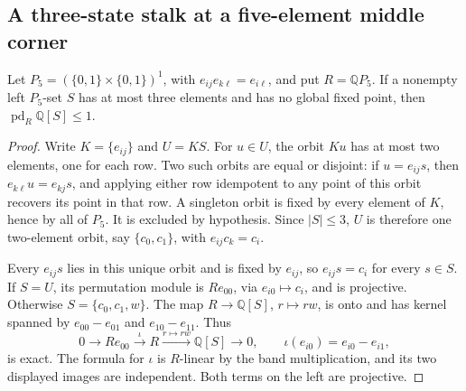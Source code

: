 \subsection{A three-state stalk at a five-element middle corner}

\begin{lemma}
\label{CP2:A-three-state-P5-left-module}
Let $P_5=(\{0,1\}\times\{0,1\})^1$, with
$e_{ij}e_{k\ell}=e_{i\ell}$, and put $R=\mathbb QP_5$.
If a nonempty left $P_5$-set $S$ has at most three elements and
has no global fixed point, then $\operatorname{pd}_R\mathbb Q[S]\leq1$.
\end{lemma}
\begin{proof}
Write $K=\{e_{ij}\}$ and $U=KS$. For $u\in U$, the orbit
$Ku$ has at most two elements, one for each row. Two such orbits
are equal or disjoint: if $u=e_{ij}s$, then
$e_{k\ell}u=e_{kj}s$, and applying either row idempotent to any
point of this orbit recovers its point in that row. A singleton
orbit is fixed by every element of $K$, hence by all of $P_5$.
It is excluded by hypothesis. Since $|S|\leq3$, $U$ is therefore
one two-element orbit, say $\{c_0,c_1\}$, with
$e_{ij}c_k=c_i$.

Every $e_{ij}s$ lies in this unique orbit and is fixed by
$e_{ij}$, so $e_{ij}s=c_i$ for every $s\in S$. If $S=U$, its
permutation module is $Re_{00}$, via $e_{i0}\mapsto c_i$, and
is projective. Otherwise $S=\{c_0,c_1,w\}$. The map
$R\to\mathbb Q[S]$, $r\mapsto rw$, is onto and has kernel
spanned by $e_{00}-e_{01}$ and $e_{10}-e_{11}$. Thus
\[
 0\longrightarrow Re_{00}\xrightarrow{\iota}R
 \xrightarrow{r\mapsto rw}\mathbb Q[S]\longrightarrow0,
 \qquad \iota(e_{i0})=e_{i0}-e_{i1},
\]
is exact. The formula for $\iota$ is $R$-linear by the band
multiplication, and its two displayed images are independent.
Both terms on the left are projective.
\end{proof}

